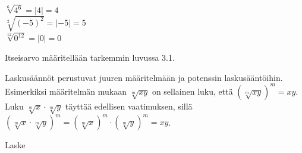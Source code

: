 \begin{esimerkki}
$\sqrt[6]{4^6}=|4| = 4$\\
$\sqrt[2]{(-5)^2}=|-5| = 5$\\
$\sqrt[12]{0^{12}}=|0|=0$
\end{esimerkki}

Itseisarvo määritellään tarkemmin luvussa 3.1. %

Laskusäännöt perustuvat juuren määritelmään ja potenssin laskusääntöihin. Esimerkiksi
määritelmän mukaan $\sqrt[m]{xy}$ on sellainen luku, että $\left( \sqrt[m]{xy} \right)^m = xy$.
Luku $\sqrt[m]{x} \cdot \sqrt[m]{y}$ täyttää edellisen vaatimuksen, sillä
$\left( \sqrt[m]{x} \cdot \sqrt[m]{y} \right)^m = \left( \sqrt[m]{x} \right)^m \cdot \left( \sqrt[m]{y} \right)^m = xy$.

\begin{esimerkki}
Laske

\begin{esimratk}
\end{esimratk}

\begin{esimvast}
\end{esimvast}

\end{esimerkki}